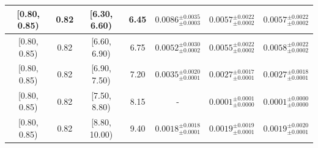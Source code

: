 \begin{longtable}{|c|c|c|c|c|c|c|}
\hline
[0.80, 0.85) & 0.82 & [6.30, 6.60) & 6.45 & $0.0086^{ \pm 0.0035 }_{ \pm 0.0003 }$ & $0.0057^{ \pm 0.0022 }_{ \pm 0.0002 }$ & $0.0057^{ \pm 0.0022 }_{ \pm 0.0002 }$ \\ 
\hline
[0.80, 0.85) & 0.82 & [6.60, 6.90) & 6.75 & $0.0052^{ \pm 0.0030 }_{ \pm 0.0002 }$ & $0.0055^{ \pm 0.0022 }_{ \pm 0.0002 }$ & $0.0058^{ \pm 0.0022 }_{ \pm 0.0002 }$ \\ 
\hline
[0.80, 0.85) & 0.82 & [6.90, 7.50) & 7.20 & $0.0035^{ \pm 0.0020 }_{ \pm 0.0001 }$ & $0.0027^{ \pm 0.0017 }_{ \pm 0.0001 }$ & $0.0027^{ \pm 0.0018 }_{ \pm 0.0001 }$ \\ 
\hline
[0.80, 0.85) & 0.82 & [7.50, 8.80) & 8.15 & - & $0.0001^{ \pm 0.0001 }_{ \pm 0.0000 }$ & $0.0001^{ \pm 0.0000 }_{ \pm 0.0000 }$ \\ 
\hline
[0.80, 0.85) & 0.82 & [8.80, 10.00) & 9.40 & $0.0018^{ \pm 0.0018 }_{ \pm 0.0001 }$ & $0.0019^{ \pm 0.0019 }_{ \pm 0.0001 }$ & $0.0019^{ \pm 0.0020 }_{ \pm 0.0001 }$ \\ 
\hline
\end{longtable}
\endgroup
